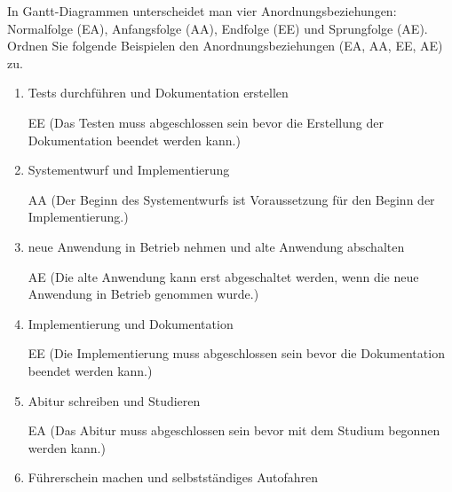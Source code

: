 \documentclass{lehramt-informatik}
\begin{document}
In Gantt-Diagrammen unterscheidet man vier Anordnungsbeziehungen:
Normalfolge (EA), Anfangsfolge (AA), Endfolge (EE) und Sprungfolge
(AE). Ordnen Sie folgende Beispielen den Anordnungsbeziehungen (EA, AA,
EE, AE) zu.

\begin{enumerate}


\item Tests durchführen und Dokumentation erstellen

\begin{antwort}
EE (Das Testen muss abgeschlossen sein bevor die Erstellung der
Dokumentation beendet werden kann.)
\end{antwort}


\item Systementwurf und Implementierung

\begin{antwort}
AA (Der Beginn des Systementwurfs ist Voraussetzung für den Beginn der
Implementierung.)
\end{antwort}


\item neue Anwendung in Betrieb nehmen und alte Anwendung abschalten

\begin{antwort}
AE (Die alte Anwendung kann erst abgeschaltet werden, wenn die neue
Anwendung in Betrieb genommen wurde.)
\end{antwort}


\item Implementierung und Dokumentation

\begin{antwort}
EE (Die Implementierung muss abgeschlossen sein bevor die Dokumentation
beendet werden kann.)
\end{antwort}


\item Abitur schreiben und Studieren

\begin{antwort}
EA (Das Abitur muss abgeschlossen sein bevor mit dem Studium begonnen
werden kann.)
\end{antwort}


\item Führerschein machen und selbstständiges Autofahren


\end{enumerate}
\end{document}
